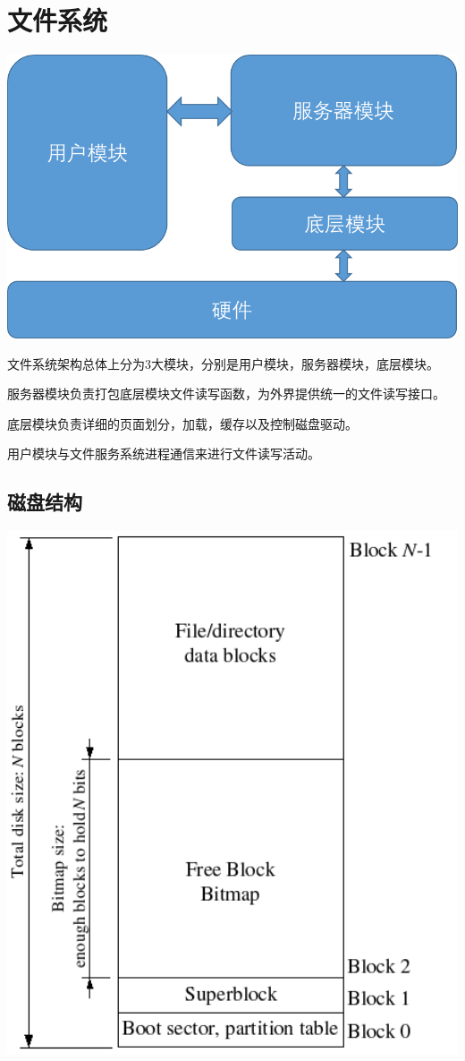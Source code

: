 \section{文件系统}

\includegraphics[width=6in]{figures/file/image107.png}

文件系统架构总体上分为3大模块，分别是用户模块，服务器模块，底层模块。

服务器模块负责打包底层模块文件读写函数，为外界提供统一的文件读写接口。

底层模块负责详细的页面划分，加载，缓存以及控制磁盘驱动。

用户模块与文件服务系统进程通信来进行文件读写活动。

\subsection{磁盘结构}

\includegraphics[width=6in]{figures/file/image108.png}


